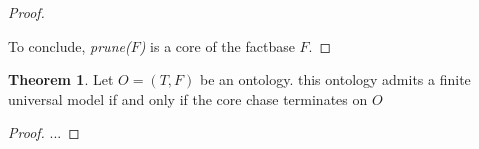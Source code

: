 \documentclass{article}
\theoremstyle{definition}
\newtheorem{theorem}{Theorem}[section]
\theoremstyle{remark}
\begin{document}
\begin{proof}
\begin{itemize}
\end{itemize}
To conclude, \emph{prune($F$)} is a core of the factbase $F$.
\end{proof}

\begin{theorem} 
Let $O = (T,F)$ be an ontology. this ontology admits a finite universal model if and only if the core chase terminates on $O$
\end{theorem}

\begin{proof}
...
\end{proof}

%
%
\end{document}
